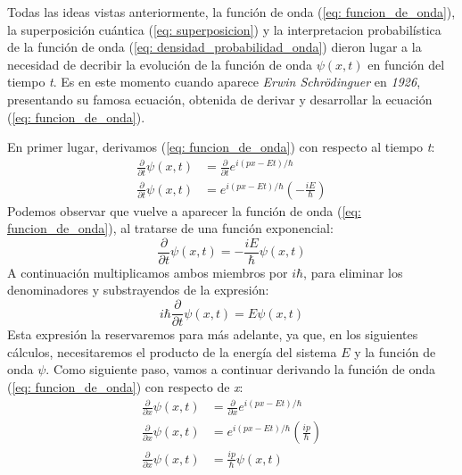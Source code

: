 \documentclass{article}
\numberwithin{equation}{section} %
\begin{document}
    \vspace{5mm}

    Todas las ideas vistas anteriormente, la función de onda (\ref{eq: funcion_de_onda}), la superposición cuántica (\ref{eq: superposicion}) y la interpretacion probabilística de la función de onda (\ref{eq: densidad_probabilidad_onda}) dieron lugar a la necesidad de decribir la evolución de la función de onda \( \psi(x, t) \) en función del tiempo \textit{t}. Es en este momento cuando aparece \textit{Erwin Schrödinguer} en \textit{1926}, presentando su famosa ecuación, obtenida de derivar y desarrollar la ecuación  (\ref{eq: funcion_de_onda}). 
    
    En primer lugar, derivamos (\ref{eq: funcion_de_onda}) con respecto al tiempo \textit{t}:
    \begin{align*}
        \frac{\partial}{\partial t} \psi(x, t) &= \frac{\partial}{\partial t} e^{i(px - Et) / \hbar} \\[8pt]
        \frac{\partial}{\partial t} \psi(x, t) &= e^{i(px - Et) / \hbar} \left(- \frac{iE}{\hbar} \right)
    \end{align*}
    Podemos observar que vuelve a aparecer la función de onda (\ref{eq: funcion_de_onda}), al tratarse de una función exponencial:
    \begin{equation*}
        \frac{\partial}{\partial t} \psi(x, t) = - \frac{iE}{\hbar} \psi(x, t)
    \end{equation*}
    A continuación multiplicamos ambos miembros por \( i\hbar \), para eliminar los denominadores y substrayendos de la expresión:
    \begin{equation}
        i \hbar \frac{\partial}{\partial t} \psi(x, t) = E \psi(x, t)
        \label{eq: obtencion_schrodinguer}
    \end{equation}
    Esta expresión la reservaremos para más adelante, ya que, en los siguientes cálculos, necesitaremos el producto de la energía del sistema \( E \) y la función de onda \( \psi \). Como siguiente paso, vamos a continuar derivando la función de onda (\ref{eq: funcion_de_onda}) con respecto de \textit{x}:
    \begin{align*}
        \frac{\partial}{\partial x} \psi(x, t) &= \frac{\partial}{\partial x} e^{i(px - Et) / \hbar} \\[10pt]
        \frac{\partial}{\partial x} \psi(x, t) &= e^{i(px - Et) / \hbar} \left( \frac{ip}{\hbar} \right) \\[10pt]
        \frac{\partial}{\partial x} \psi(x, t) &= \frac{ip}{\hbar} \psi(x, t)
    \end{align*}
\end{document}

